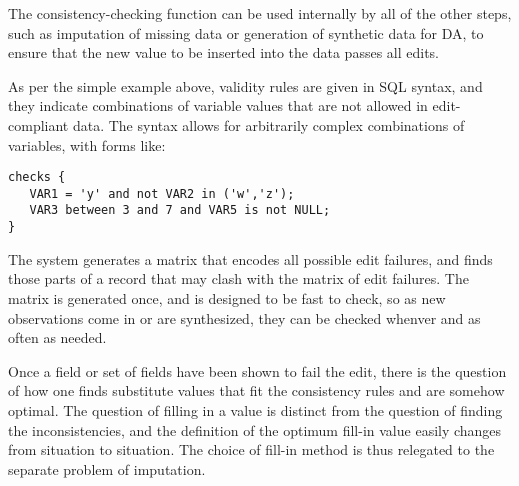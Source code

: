 \documentclass{article}
\begin{document}
The consistency-checking function can be used internally by all of the other steps, such as
imputation of missing data or generation of synthetic data for DA, to ensure
that the new value to be inserted into the data passes all edits. 


As per the simple example above, validity rules are given in SQL syntax, and they
indicate combinations of variable values that are not allowed in edit-compliant data. The
syntax allows for arbitrarily complex combinations of variables, with forms like:
\begin{lstlisting}
checks {
   VAR1 = 'y' and not VAR2 in ('w','z');
   VAR3 between 3 and 7 and VAR5 is not NULL;
}
\end{lstlisting}

The system generates a matrix that encodes all possible edit failures, and finds
those parts of a record that may clash with the matrix of edit failures. The matrix
is generated once, and is designed to be fast to check, so as new observations come
in or are synthesized, they can be checked whenver and as often as needed.

Once a field or set of fields have been shown to fail the edit, there is the question of
how one finds substitute values that fit the consistency rules and are somehow optimal.
The question of filling in a value is distinct from the  question of finding the
inconsistencies, and the definition of the optimum fill-in value easily changes from
situation to situation. The choice of fill-in method is thus relegated to the separate
problem of imputation.
\end{document}
